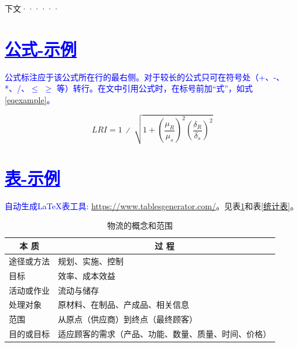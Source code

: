 下文······

\section{\textcolor{blue}{\underline{\underline{公式-示例}}}}

\textcolor{blue}{公式标注应于该公式所在行的最右侧。对于较长的公式只可在符号处（+、-、*、/、$\leqslant$ $\geqslant$ 等）转行。在文中引用公式时，在标号前加“式”，如式\ref{eqexample}。}


\begin{equation}
    LRI=1\ ∕\ \sqrt{ 1 + {\left(\frac{{\mu}_{R}}{{\mu}_{s}}\right)^{2}}{\left(\frac{{\delta}_{R}}{{\delta}_{s}}\right)^{2}} }
    \label{eqexample}
\end{equation}

\section{\textcolor{blue}{\underline{\underline{表-示例}}}}

\textcolor{blue}{{自动生成LaTeX表工具: \url{https://www.tablesgenerator.com/}}}。见表\ref{物流的概念和范围}和表\ref{统计表}。

\begin{table}[htbp]
  \linespread{1.5}
  \songti
  \centering
  \caption{物流的概念和范围}\label{物流的概念和范围}
  \begin{tabular}{|l|l|}
  \hline
  \multicolumn{1}{|c|}{本 质} & \multicolumn{1}{c|}{过  程}  \\ \hline
  途径或方法                     & 规划、实施、控制                   \\ \hline
  目标                        & 效率、成本效益                    \\ \hline
  活动或作业                     & 流动与储存                      \\ \hline
  处理对象                      & 原材料、在制品、产成品、相关信息           \\ \hline
  范围                        & 从原点（供应商）到终点（最终顾客）          \\ \hline
  目的或目标                     & 适应顾客的需求（产品、功能、数量、质量、时间、价格） \\ \hline
  \end{tabular}
\end{table}

